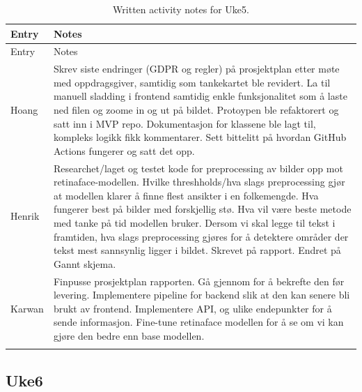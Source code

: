 \begin{longtable}{p{}p{}}
\caption{Written activity notes for Uke5.}\\
\toprule
Entry & Notes \\
\midrule
\endfirsthead
\toprule
Entry & Notes \\
\midrule
\endhead
Hoang & Skrev siste endringer (GDPR og regler) på prosjektplan etter møte med oppdragsgiver, samtidig som tankekartet ble revidert. La til manuell sladding i frontend samtidig enkle funksjonalitet som å laste ned filen og zoome in og ut på bildet. Protoypen ble refaktorert og satt inn i MVP repo. Dokumentasjon for klassene ble lagt til, kompleks logikk fikk kommentarer. Sett bittelitt på hvordan GitHub Actions fungerer og satt det opp. \\
\addlinespace
Henrik & Researchet/laget og testet kode for preprocessing av bilder opp mot retinaface-modellen. Hvilke threshholds/hva slags preprocessing gjør at modellen klarer å finne flest ansikter i en folkemengde. Hva fungerer best på bilder med forskjellig stø. Hva vil være beste metode med tanke på tid modellen bruker. Dersom vi skal legge til tekst i framtiden, hva slags preprocessing gjøres for å detektere områder der tekst mest sannsynlig ligger i bildet. Skrevet på rapport. Endret på Gannt skjema. \\
\addlinespace
Karwan & Finpusse prosjektplan rapporten. Gå gjennom for å bekrefte den før levering. Implementere pipeline for backend slik at den kan senere bli brukt av frontend. Implementere API, og ulike endepunkter for å sende informasjon. Fine-tune retinaface modellen for å se om vi kan gjøre den bedre enn base modellen. \\
\addlinespace
\bottomrule
\end{longtable}

\subsection{Uke6}


